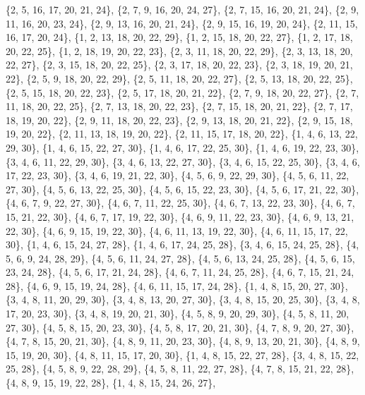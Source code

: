 \documentclass[11pt,a4paper]{article}
\begin{document}
{\{2, 5, 16, 17, 20, 21, 24\}, \{2, 7, 9, 16, 20, 24, 27\}, \{2, 7, 15, 16, 20, 21, 24\}, \{2, 9, 11, 16, 20, 23, 24\}, \{2, 9, 13, 16, 20, 21, 24\},
\{2, 9, 15, 16, 19, 20, 24\}, \{2, 11, 15, 16, 17, 20, 24\}, \{1, 2, 13, 18, 20, 22, 29\}, \{1, 2, 15, 18, 20, 22, 27\}, \{1, 2, 17, 18, 20, 22, 25\},
\{1, 2, 18, 19, 20, 22, 23\}, \{2, 3, 11, 18, 20, 22, 29\}, \{2, 3, 13, 18, 20, 22, 27\}, \{2, 3, 15, 18, 20, 22, 25\}, \{2, 3, 17, 18, 20, 22, 23\},
\{2, 3, 18, 19, 20, 21, 22\}, \{2, 5, 9, 18, 20, 22, 29\}, \{2, 5, 11, 18, 20, 22, 27\}, \{2, 5, 13, 18, 20, 22, 25\}, \{2, 5, 15, 18, 20, 22, 23\},
\{2, 5, 17, 18, 20, 21, 22\}, \{2, 7, 9, 18, 20, 22, 27\}, \{2, 7, 11, 18, 20, 22, 25\}, \{2, 7, 13, 18, 20, 22, 23\}, \{2, 7, 15, 18, 20, 21, 22\},
\{2, 7, 17, 18, 19, 20, 22\}, \{2, 9, 11, 18, 20, 22, 23\}, \{2, 9, 13, 18, 20, 21, 22\}, \{2, 9, 15, 18, 19, 20, 22\}, \{2, 11, 13, 18, 19, 20, 22\},
\{2, 11, 15, 17, 18, 20, 22\}, \{1, 4, 6, 13, 22, 29, 30\}, \{1, 4, 6, 15, 22, 27, 30\}, \{1, 4, 6, 17, 22, 25, 30\}, \{1, 4, 6, 19, 22, 23, 30\},
\{3, 4, 6, 11, 22, 29, 30\}, \{3, 4, 6, 13, 22, 27, 30\}, \{3, 4, 6, 15, 22, 25, 30\}, \{3, 4, 6, 17, 22, 23, 30\}, \{3, 4, 6, 19, 21, 22, 30\},
\{4, 5, 6, 9, 22, 29, 30\}, \{4, 5, 6, 11, 22, 27, 30\}, \{4, 5, 6, 13, 22, 25, 30\}, \{4, 5, 6, 15, 22, 23, 30\}, \{4, 5, 6, 17, 21, 22, 30\},
\{4, 6, 7, 9, 22, 27, 30\}, \{4, 6, 7, 11, 22, 25, 30\}, \{4, 6, 7, 13, 22, 23, 30\}, \{4, 6, 7, 15, 21, 22, 30\}, \{4, 6, 7, 17, 19, 22, 30\},
\{4, 6, 9, 11, 22, 23, 30\}, \{4, 6, 9, 13, 21, 22, 30\}, \{4, 6, 9, 15, 19, 22, 30\}, \{4, 6, 11, 13, 19, 22, 30\}, \{4, 6, 11, 15, 17, 22, 30\},
\{1, 4, 6, 15, 24, 27, 28\}, \{1, 4, 6, 17, 24, 25, 28\}, \{3, 4, 6, 15, 24, 25, 28\}, \{4, 5, 6, 9, 24, 28, 29\}, \{4, 5, 6, 11, 24, 27, 28\},
\{4, 5, 6, 13, 24, 25, 28\}, \{4, 5, 6, 15, 23, 24, 28\}, \{4, 5, 6, 17, 21, 24, 28\}, \{4, 6, 7, 11, 24, 25, 28\}, \{4, 6, 7, 15, 21, 24, 28\},
\{4, 6, 9, 15, 19, 24, 28\}, \{4, 6, 11, 15, 17, 24, 28\}, \{1, 4, 8, 15, 20, 27, 30\}, \{3, 4, 8, 11, 20, 29, 30\}, \{3, 4, 8, 13, 20, 27, 30\},
\{3, 4, 8, 15, 20, 25, 30\}, \{3, 4, 8, 17, 20, 23, 30\}, \{3, 4, 8, 19, 20, 21, 30\}, \{4, 5, 8, 9, 20, 29, 30\}, \{4, 5, 8, 11, 20, 27, 30\},
\{4, 5, 8, 15, 20, 23, 30\}, \{4, 5, 8, 17, 20, 21, 30\}, \{4, 7, 8, 9, 20, 27, 30\}, \{4, 7, 8, 15, 20, 21, 30\}, \{4, 8, 9, 11, 20, 23, 30\},
\{4, 8, 9, 13, 20, 21, 30\}, \{4, 8, 9, 15, 19, 20, 30\}, \{4, 8, 11, 15, 17, 20, 30\}, \{1, 4, 8, 15, 22, 27, 28\}, \{3, 4, 8, 15, 22, 25, 28\},
\{4, 5, 8, 9, 22, 28, 29\}, \{4, 5, 8, 11, 22, 27, 28\}, \{4, 7, 8, 15, 21, 22, 28\}, \{4, 8, 9, 15, 19, 22, 28\}, \{1, 4, 8, 15, 24, 26, 27\},
}
\end{document}
